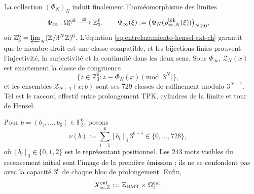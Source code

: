 La collection \((\Phi_N)_N\) induit finalement l'homéomorphisme des limites
\begin{equation}
 \Phi_\infty:\Omega_\Gamma^{\rm cal}
 \xrightarrow{\ \cong\ }\mathbb Z_3^6,\qquad
 \Phi_\infty(\xi):=
 \bigl(\Phi_N(\rho^{\rm blk}_{\infty,N}(\xi))\bigr)_{N\ge0},
 \label{eq:phi-infinito-hensel-ext-ch}
\end{equation}
où
\(\mathbb Z_3^6=\varprojlim_N(\mathbb Z/3^N\mathbb Z)^6\).
L’équation \eqref{eq:entrelazamiento-hensel-ext-ch} garantit que le membre
droit est une classe compatible, et les bijections finies prouvent
l’injectivité, la surjectivité et la continuité dans les deux sens. Sous
\(\Phi_\infty\), \(\mathscr Z_N(x)\) est exactement la classe de congruence
\[
 \{z\in\mathbb Z_3^6:z\equiv\Phi_N(x)\pmod{3^N}\},
\]
et les ensembles \(\mathscr Z_{N+1}(x;b)\) sont ses \(729\) classes de raffinement
modulo \(3^{N+1}\). Tel est le raccord effectif entre prolongement TPK,
cylindres de la limite et tour de Hensel.

Pour \(b=(b_1,\ldots,b_6)\in\mathbb F_3^6\), posons
\[
 \nu(b):=\sum_{i=1}^{6}[b_i]_3\,3^{6-i}
 \in\{0,\ldots,728\},
\tag{C.40c$_0$}
\label{eq:valor-bloque-ch}
\]
où \([b_i]_3\in\{0,1,2\}\) est le représentant positionnel. Les
\(243\) mots visibles du recensement initial sont l’image de la première
émission ; ils ne se confondent pas avec la capacité \(3^6\) de chaque bloc de
prolongement. Enfin,
\[
 X_{\infty,\mathbb Z}^{\rm cal}
 :=\mathbb Z_{\rm HMT}\times\Omega_\Gamma^{\rm cal}.
\]

